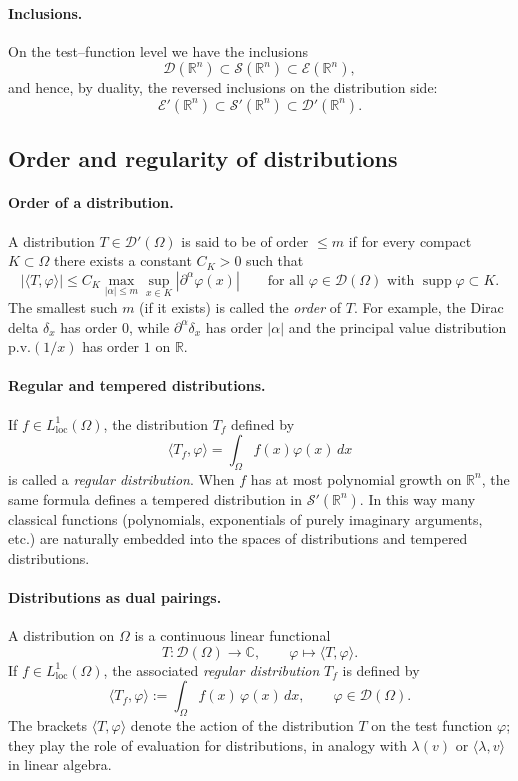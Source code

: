\documentclass[12pt,a4paper]{article}
\theoremstyle{plain}
\theoremstyle{definition}
\theoremstyle{remark}
\theoremstyle{remark}
\begin{document}
\paragraph{Inclusions.}
On the test--function level we have the inclusions
\[
\mathcal{D}(\mathbb{R}^n)
\subset \mathcal{S}(\mathbb{R}^n)
\subset \mathcal{E}(\mathbb{R}^n),
\]
and hence, by duality, the reversed inclusions on the distribution side:
\[
\mathcal{E}'(\mathbb{R}^n)
\subset \mathcal{S}'(\mathbb{R}^n)
\subset \mathcal{D}'(\mathbb{R}^n).
\]

\subsection*{Order and regularity of distributions}

\paragraph{Order of a distribution.}
A distribution $T\in\mathcal{D}'(\Omega)$ is said to be of order
$\le m$ if for every compact $K\subset\Omega$ there exists a constant
$C_K>0$ such that
\[
|\langle T,\varphi\rangle|
\le C_K
\max_{|\alpha|\le m}
\sup_{x\in K}
|\partial^\alpha\varphi(x)|
\qquad\text{for all }
\varphi\in\mathcal{D}(\Omega)
\text{ with }\operatorname{supp}\varphi\subset K.
\]
The smallest such $m$ (if it exists) is called the \emph{order} of $T$.
For example, the Dirac delta $\delta_x$ has order $0$, while
$\partial^\alpha\delta_x$ has order $|\alpha|$ and the principal value
distribution $\mathrm{p.v.}(1/x)$ has order $1$ on $\mathbb{R}$.

\paragraph{Regular and tempered distributions.}
If $f\in L^1_{\mathrm{loc}}(\Omega)$, the distribution $T_f$ defined by
\[
\langle T_f,\varphi\rangle
= \int_\Omega f(x)\varphi(x)\,dx
\]
is called a \emph{regular distribution}. When $f$ has at most polynomial
growth on $\mathbb{R}^n$, the same formula defines a tempered
distribution in $\mathcal{S}'(\mathbb{R}^n)$. In this way many classical
functions (polynomials, exponentials of purely imaginary arguments,
etc.) are naturally embedded into the spaces of distributions and
tempered distributions.

\paragraph{Distributions as dual pairings.}
A distribution on $\Omega$ is a continuous linear functional
\[
T:\mathcal{D}(\Omega)\to\mathbb{C},\qquad
\varphi\mapsto\langle T,\varphi\rangle.
\]
If $f\in L^1_{\mathrm{loc}}(\Omega)$, the associated
\emph{regular distribution} $T_f$ is defined by
\[
\langle T_f,\varphi\rangle
:= \int_\Omega f(x)\,\varphi(x)\,dx,
\qquad \varphi\in\mathcal{D}(\Omega).
\]
The brackets $\langle T,\varphi\rangle$ denote the action of the
distribution $T$ on the test function $\varphi$; they play the role of
evaluation for distributions, in analogy with $\lambda(v)$ or
$\langle \lambda,v\rangle$ in linear algebra.
\end{document}
